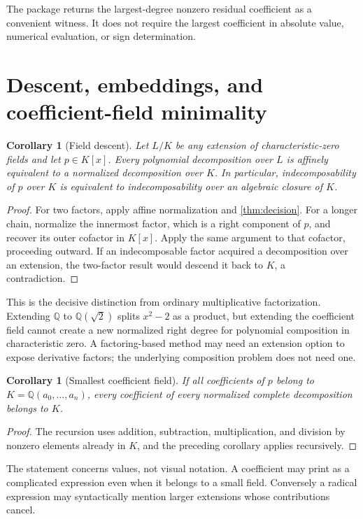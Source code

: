 \documentclass[11pt,a4paper]{article}
\newtheorem{corollary}[theorem]{Corollary}
\theoremstyle{definition}
\newcommand{\Q}{\mathbb Q}
\newcommand{\code}[1]{\texttt{\detokenize{#1}}}
\begin{document}
The package returns the largest-degree nonzero residual coefficient as a convenient witness. It does not require the largest coefficient in absolute value, numerical evaluation, or sign determination.

\section{Descent, embeddings, and coefficient-field minimality}
\begin{corollary}[Field descent]\label{cor:descent}
Let $L/K$ be any extension of characteristic-zero fields and let $p\in K[x]$. Every polynomial decomposition over $L$ is affinely equivalent to a normalized decomposition over $K$. In particular, indecomposability of $p$ over $K$ is equivalent to indecomposability over an algebraic closure of $K$.
\end{corollary}
\begin{proof}
For two factors, apply affine normalization and \cref{thm:decision}. For a longer chain, normalize the innermost factor, which is a right component of $p$, and recover its outer cofactor in $K[x]$. Apply the same argument to that cofactor, proceeding outward. If an indecomposable factor acquired a decomposition over an extension, the two-factor result would descend it back to $K$, a contradiction.
\end{proof}

This is the decisive distinction from ordinary multiplicative factorization. Extending $\Q$ to $\Q(\sqrt2)$ splits $x^2-2$ as a product, but extending the coefficient field cannot create a new normalized right degree for polynomial composition in characteristic zero. A factoring-based method may need an extension option to expose derivative factors; the underlying composition problem does not need one.

\begin{corollary}[Smallest coefficient field]
If all coefficients of $p$ belong to $K=\Q(a_0,\ldots,a_n)$, every coefficient of every normalized complete decomposition belongs to $K$.
\end{corollary}
\begin{proof}
The recursion uses addition, subtraction, multiplication, and division by nonzero elements already in $K$, and the preceding corollary applies recursively.
\end{proof}

The statement concerns values, not visual notation. A coefficient may print as a complicated \code{Root} expression even when it belongs to a small field. Conversely a radical expression may syntactically mention larger extensions whose contributions cancel.
\end{document}
